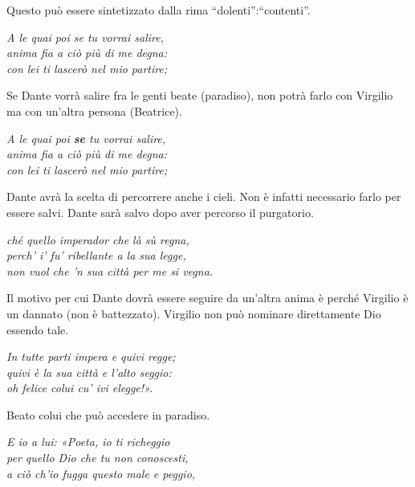 \documentclass[a4paper]{article}
\newcommand{\quotes}[1]{``#1''}
\begin{document}
Questo può essere sintetizzato dalla rima \quotes{dolenti}:\quotes{contenti}.

\begin{center}
    \textit{A le quai poi se tu vorrai salire,} \\
    \textit{anima fia a ciò più di me degna:} \\
    \textit{con lei ti lascerò nel mio partire;}
\end{center}

Se Dante vorrà salire fra le genti beate (paradiso), non potrà farlo con Virgilio
ma con un'altra persona (Beatrice).

\begin{center}
    \textit{A le quai poi \textbf{se} tu vorrai salire,} \\
    \textit{anima fia a ciò più di me degna:} \\
    \textit{con lei ti lascerò nel mio partire;}
\end{center}

Dante avrà la scelta di percorrere anche i cieli. Non è infatti necessario
farlo per essere salvi. Dante sarà salvo dopo aver percorso il purgatorio.

\begin{center}
    \textit{ché quello imperador che là sù regna,} \\
    \textit{perch' i' fu' ribellante a la sua legge,} \\
    \textit{non vuol che 'n sua città per me si vegna.}
\end{center}

Il motivo per cui Dante dovrà essere seguire da un'altra anima
è perché Virgilio è un dannato (non è battezzato). 
Virgilio non può nominare direttamente Dio essendo tale.


\begin{center}
    \textit{In tutte parti impera e quivi regge;} \\
    \textit{quivi è la sua città e l'alto seggio:} \\
    \textit{oh felice colui cu' ivi elegge!».}
\end{center}

Beato colui che può accedere in paradiso.

\begin{center}
    \textit{E io a lui: «Poeta, io ti richeggio} \\
    \textit{per quello Dio che tu non conoscesti,} \\
    \textit{a ciò ch'io fugga questo male e peggio,}
\end{center}
\end{document}
